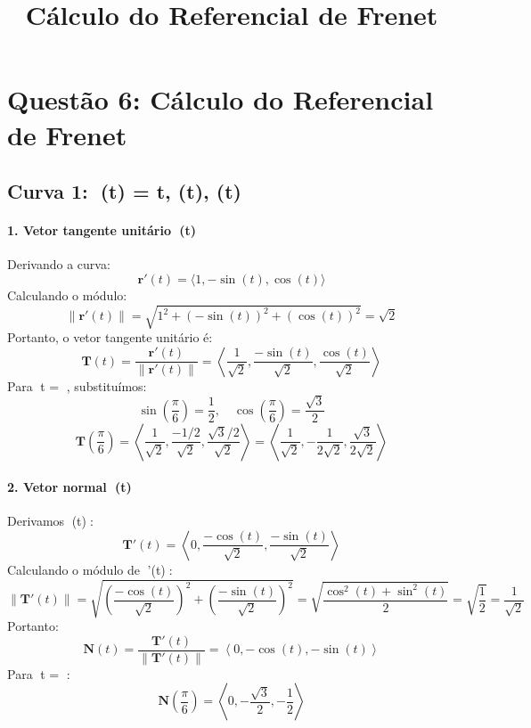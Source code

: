 \documentclass[a4paper,12pt]{article}
\title{Cálculo do Referencial de Frenet}
\author{}
\date{}
\begin{document}
\maketitle

\section*{Questão 6: Cálculo do Referencial de Frenet}

\subsection*{Curva 1: (t) = \langle t, \cos(t), \sin(t) \rangle}
\paragraph{1. Vetor tangente unitário (t)}
Derivando a curva:
\[
\mathbf{r}'(t) = \langle 1, -\sin(t), \cos(t) \rangle
\]
Calculando o módulo:
\[
\|\mathbf{r}'(t)\| = \sqrt{1^2 + (-\sin(t))^2 + (\cos(t))^2} = \sqrt{2}
\]
Portanto, o vetor tangente unitário é:
\[
\mathbf{T}(t) = \frac{\mathbf{r}'(t)}{\|\mathbf{r}'(t)\|} = \left\langle \frac{1}{\sqrt{2}}, \frac{-\sin(t)}{\sqrt{2}}, \frac{\cos(t)}{\sqrt{2}} \right\rangle
\]
Para t = , substituímos:
\[
\sin\left(\frac{\pi}{6}\right) = \frac{1}{2}, \quad \cos\left(\frac{\pi}{6}\right) = \frac{\sqrt{3}}{2}
\]
\[
\mathbf{T}\left(\frac{\pi}{6}\right) = \left\langle \frac{1}{\sqrt{2}}, \frac{-1/2}{\sqrt{2}}, \frac{\sqrt{3}/2}{\sqrt{2}} \right\rangle = \left\langle \frac{1}{\sqrt{2}}, -\frac{1}{2\sqrt{2}}, \frac{\sqrt{3}}{2\sqrt{2}} \right\rangle
\]

\paragraph{2. Vetor normal (t)}
Derivamos (t):
\[
\mathbf{T}'(t) = \left\langle 0, \frac{-\cos(t)}{\sqrt{2}}, \frac{-\sin(t)}{\sqrt{2}} \right\rangle
\]
Calculando o módulo de '(t):
\[
\|\mathbf{T}'(t)\| = \sqrt{\left(\frac{-\cos(t)}{\sqrt{2}}\right)^2 + \left(\frac{-\sin(t)}{\sqrt{2}}\right)^2} = \sqrt{\frac{\cos^2(t) + \sin^2(t)}{2}} = \sqrt{\frac{1}{2}} = \frac{1}{\sqrt{2}}
\]
Portanto:
\[
\mathbf{N}(t) = \frac{\mathbf{T}'(t)}{\|\mathbf{T}'(t)\|} = \left\langle 0, -\cos(t), -\sin(t) \right\rangle
\]
Para t = :
\[
\mathbf{N}\left(\frac{\pi}{6}\right) = \left\langle 0, -\frac{\sqrt{3}}{2}, -\frac{1}{2} \right\rangle
\]
\end{document}
